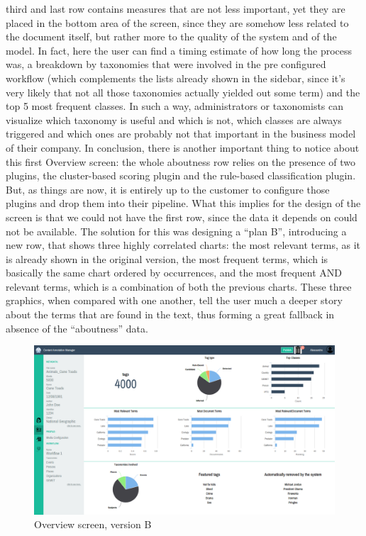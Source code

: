 \documentclass[12pt,svgnames]{memoir}
\begin{document}
third and last row contains measures that are not less important, yet
they are placed in the bottom area of the screen, since they are somehow
less related to the document itself, but rather more to the quality of
the system and of the model. In fact, here the user can find a timing
estimate of how long the process was, a breakdown by taxonomies that
were involved in the pre configured workflow (which complements the
lists already shown in the sidebar, since it's very likely that not all
those taxonomies actually yielded out some term) and the top 5 most
frequent classes. In such a way, administrators or taxonomists can
visualize which taxonomy is useful and which is not, which classes are
always triggered and which ones are probably not that important in the
business model of their company. In conclusion, there is another
important thing to notice about this first Overview screen: the whole
aboutness row relies on the presence of two plugins, the cluster-based
scoring plugin and the rule-based classification plugin. But, as things
are now, it is entirely up to the customer to configure those plugins
and drop them into their pipeline. What this implies for the design of
the screen is that we could not have the first row, since the data it
depends on could not be available. The solution for this was designing a
``plan B'', introducing a new row, that shows three highly correlated
charts: the most relevant terms, as it is already shown in the original
version, the most frequent terms, which is basically the same chart
ordered by occurrences, and the most frequent AND relevant terms, which
is a combination of both the previous charts. These three graphics, when
compared with one another, tell the user much a deeper story about the
terms that are found in the text, thus forming a great fallback in
absence of the ``aboutness'' data.

\begin{figure}[htbp]
\centering
\includegraphics{./src/img/overview-B.png}
\caption{Overview screen, version B}
\end{figure}
\end{document}
